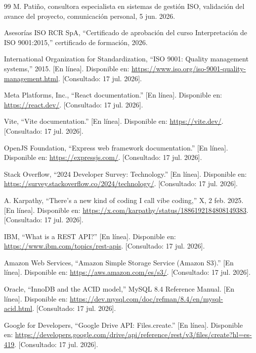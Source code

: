 \documentclass[final]{udpthesis}
\begin{document}
\begin{thebibliography}{99}
M. Patiño, consultora especialista en sistemas de gestión ISO, validación del avance del proyecto, comunicación personal, 5 jun. 2026.

Asesorías ISO RCR SpA, ``Certificado de aprobación del curso Interpretación de ISO 9001:2015,'' certificado de formación, 2026.

International Organization for Standardization, ``ISO 9001: Quality management systems,'' 2015. [En línea]. Disponible en: \url{https://www.iso.org/iso-9001-quality-management.html}. [Consultado: 17 jul. 2026].

Meta Platforms, Inc., ``React documentation.'' [En línea]. Disponible en: \url{https://react.dev/}. [Consultado: 17 jul. 2026].

Vite, ``Vite documentation.'' [En línea]. Disponible en: \url{https://vite.dev/}. [Consultado: 17 jul. 2026].

OpenJS Foundation, ``Express web framework documentation.'' [En línea]. Disponible en: \url{https://expressjs.com/}. [Consultado: 17 jul. 2026].

Stack Overflow, ``2024 Developer Survey: Technology.'' [En línea]. Disponible en: \url{https://survey.stackoverflow.co/2024/technology/}. [Consultado: 17 jul. 2026].

A. Karpathy, ``There's a new kind of coding I call vibe coding,'' X, 2 feb. 2025. [En línea]. Disponible en: \url{https://x.com/karpathy/status/1886192184808149383}. [Consultado: 17 jul. 2026].

IBM, ``What is a REST API?'' [En línea]. Disponible en: \url{https://www.ibm.com/topics/rest-apis}. [Consultado: 17 jul. 2026].

Amazon Web Services, ``Amazon Simple Storage Service (Amazon S3).'' [En línea]. Disponible en: \url{https://aws.amazon.com/es/s3/}. [Consultado: 17 jul. 2026].

Oracle, ``InnoDB and the ACID model,'' MySQL 8.4 Reference Manual. [En línea]. Disponible en: \url{https://dev.mysql.com/doc/refman/8.4/en/mysql-acid.html}. [Consultado: 17 jul. 2026].

Google for Developers, ``Google Drive API: Files.create.'' [En línea]. Disponible en: \url{https://developers.google.com/drive/api/reference/rest/v3/files/create?hl=es-419}. [Consultado: 17 jul. 2026].


\end{thebibliography}
\end{document}
